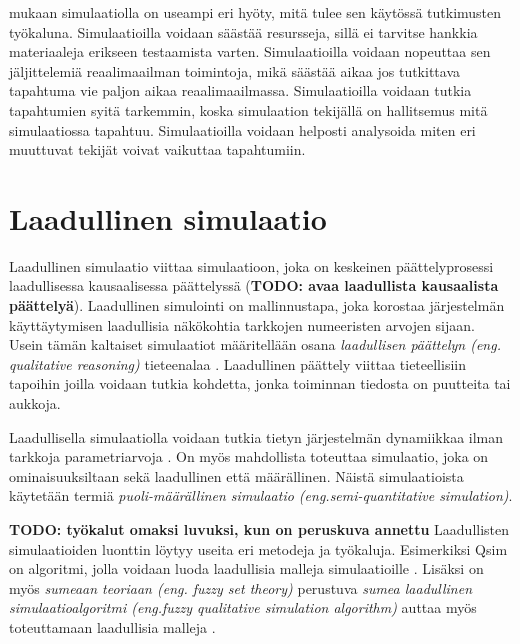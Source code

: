 \documentclass[utf8]{gradu3}
\begin{document}
\cite{banks1999introduction} mukaan simulaatiolla on useampi eri hyöty, mitä tulee sen käytössä tutkimusten työkaluna. Simulaatioilla voidaan säästää resursseja, sillä ei tarvitse hankkia materiaaleja erikseen testaamista varten. Simulaatioilla voidaan nopeuttaa sen jäljittelemiä reaalimaailman toimintoja, mikä säästää aikaa jos tutkittava tapahtuma vie paljon aikaa reaalimaailmassa. Simulaatioilla voidaan tutkia tapahtumien syitä tarkemmin, koska simulaation tekijällä on hallitsemus mitä simulaatiossa tapahtuu. Simulaatioilla voidaan helposti analysoida miten eri muuttuvat tekijät voivat vaikuttaa tapahtumiin. 


\section{Laadullinen simulaatio} \label{laadullinen simulaatio}
Laadullinen simulaatio viittaa simulaatioon, joka on keskeinen päättelyprosessi laadullisessa kausaalisessa päättelyssä \parencite{kuipers1986qualitative} (\textbf{TODO: avaa laadullista kausaalista päättelyä}). Laadullinen simulointi on mallinnustapa, joka korostaa järjestelmän käyttäytymisen laadullisia näkökohtia tarkkojen numeeristen arvojen sijaan. Usein tämän kaltaiset simulaatiot määritellään osana \textit{laadullisen päättelyn (eng. qualitative reasoning)} tieteenalaa
%
\parencites%
  {parallelQualitativeSimulation1997}%
  {kuipers1986qualitative}%
\relax.
%
Laadullinen päättely viittaa tieteellisiin tapoihin joilla voidaan tutkia kohdetta, jonka toiminnan tiedosta on puutteita tai aukkoja.

Laadullisella simulaatiolla voidaan tutkia tietyn järjestelmän dynamiikkaa ilman tarkkoja parametriarvoja \parencite{cosme2023history}. On myös mahdollista toteuttaa simulaatio, joka on ominaisuuksiltaan sekä laadullinen että määrällinen. Näistä simulaatioista käytetään termiä \textit{ puoli-määrällinen simulaatio (eng.semi-quantitative simulation)}\parencite{semiHybrid1997qualitative}.

\textbf{TODO: työkalut omaksi luvuksi, kun on peruskuva annettu}
Laadullisten simulaatioiden luonttin löytyy useita eri metodeja ja työkaluja.
Esimerkiksi Qsim on algoritmi, jolla voidaan luoda laadullisia malleja simulaatioille \parencite{kuipers1986qualitative}. Lisäksi on myös \textit{sumeaan teoriaan (eng. fuzzy set theory)} perustuva \textit{sumea laadullinen simulaatioalgoritmi (eng.fuzzy qualitative simulation algorithm)} auttaa myös toteuttamaan laadullisia malleja \parencite{shen1993fuzzy}.
\end{document}
